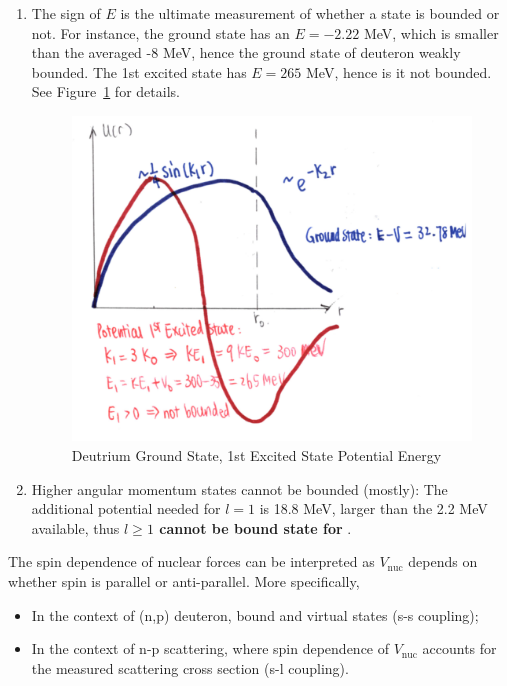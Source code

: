 \documentclass{school-22.101-notes}
\begin{document}
\begin{enumerate}
\item The sign of $E$ is the ultimate measurement of whether a state is bounded or not. For instance, the ground state has an $E = -2.22 $ MeV, which is smaller than the averaged -8 MeV, hence the ground state of deuteron weakly bounded. The 1st excited state has $E = 265$ MeV, hence is it not bounded. See Figure~\ref{deuteron-bound} for details. 

\begin{figure}
    \centering
    \includegraphics[width=5in]{images/deuteron/deuteron-states.png}
    \caption{Deutrium Ground State, 1st Excited State Potential Energy}    \label{deuteron-bound}
\end{figure}

\item Higher angular momentum states cannot be bounded (mostly):
The additional potential needed for $l=1$ is 18.8 MeV, larger than the 2.2 MeV available, thus \textbf{$l \ge 1$ cannot be bound state for }. 
\end{enumerate}



The spin dependence of nuclear forces can be interpreted as $V_{\mathrm{nuc}}$ depends on whether spin is parallel or anti-parallel. More specifically, 
\begin{itemize}
    \item In the context of (n,p) deuteron, bound and virtual states (s-s coupling);
    \item In the context of n-p scattering, where spin dependence of $V_{\mathrm{nuc}}$ accounts for the measured scattering cross section (s-l coupling). 
\end{itemize}
\end{document}
